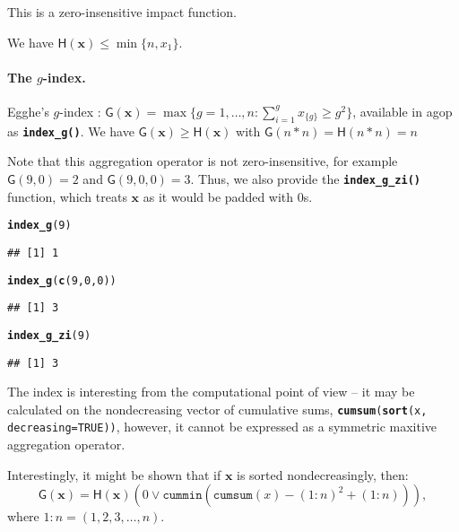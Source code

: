 \documentclass[11pt]{article}\usepackage{graphicx, color}
\makeatletter
\newcommand{\hlfunctioncall}[1]{\textcolor[rgb]{0.501960784313725,0,0.329411764705882}{\textbf{#1}}}%
\newcommand{\hlargument}[1]{\textcolor[rgb]{0.690196078431373,0.250980392156863,0.0196078431372549}{#1}}%
\newenvironment{kframe}{%
 \def\at@end@of@kframe{}%
 \ifinner\ifhmode%
  \def\at@end@of@kframe{\end{minipage}}%
  \begin{minipage}{\columnwidth}%
 \fi\fi%
 \def\FrameCommand##1{\hskip\@totalleftmargin \hskip-\fboxsep
 \colorbox{shadecolor}{##1}\hskip-\fboxsep
     \hskip-\linewidth \hskip-\@totalleftmargin \hskip\columnwidth}%
 \MakeFramed {\advance\hsize-\width
   \@totalleftmargin\z@ \linewidth\hsize
   \@setminipage}}%
 {\par\unskip\endMakeFramed%
 \at@end@of@kframe}
\newenvironment{knitrout}{}{} %
\newcommand{\package}[1]{\textsf{#1}\xspace}
\newcommand{\Rfunc}[1]{\texttt{\hlfunctioncall{#1}}}
\newcommand{\argument}[1]{\texttt{\hlargument{#1}}}
\newcommand{\vect}[1]{{\mathbf{#1}}}
\newcommand{\func}[1]{{\mathsf{#1}}}
\theoremstyle{remark}
\theoremstyle{definition}
\makeatother
\begin{document}
This is a zero-insensitive impact function.

We have $\func{H}(\vect{x})\le \min\{n, x_{1}\}$.

\paragraph{The $g$-index.}
Egghe's $g$-index \cite{Egghe2006:g}:
$\func{G}(\vect{x})=\max\{g=1,\dots,n: \sum_{i=1}^g x_{\{g\}}\ge g^2\}$,
available in \package{agop} as \Rfunc{index\_g()}.
We have $\func{G}(\vect{x})\ge \func{H}(\vect{x})$
with $\func{G}(n\ast n)=\func{H}(n\ast n)=n$


Note that this aggregation operator is not zero-insensitive,
for example $\func{G}(9,0)=2$ and $\func{G}(9,0,0)=3$.
Thus, we also provide the \Rfunc{index\_g\_zi()} function,
which treats $\vect{x}$ as it would be padded with $0$s.


\begin{knitrout}\small
{}\color{fgcolor}\begin{kframe}
\begin{alltt}
\hlfunctioncall{index_g}(9)
\end{alltt}
\begin{verbatim}
## [1] 1
\end{verbatim}
\begin{alltt}
\hlfunctioncall{index_g}(\hlfunctioncall{c}(9,0,0))
\end{alltt}
\begin{verbatim}
## [1] 3
\end{verbatim}
\begin{alltt}
\hlfunctioncall{index_g_zi}(9)
\end{alltt}
\begin{verbatim}
## [1] 3
\end{verbatim}
\end{kframe}
\end{knitrout}


The index is interesting from the computational point of view --
it may be calculated on the nondecreasing vector of cumulative sums,
\texttt{\Rfunc{cumsum}(\Rfunc{sort}(x, \argument{decreasing=}TRUE))},
however, it cannot be expressed as a symmetric maxitive aggregation operator.

Interestingly, it might be shown that if $\vect{x}$ is sorted
nondecreasingly, then:
\[
\func{G}(\vect{x}) = \func{H}(\vect{x})(0\vee \mathtt{cummin}(\mathtt{cumsum}(x)-(1:n)^2+(1:n))),
\]
where $1:n = (1, 2, 3, \dots, n)$.
\end{document}
